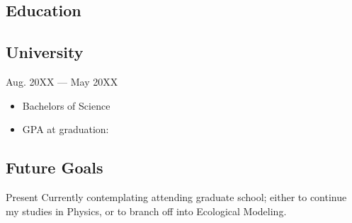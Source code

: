 \documentclass[letterpaper]{easyCV}
\begin{document}
\begin{main}
\section{Education}
\subsection{University}{Aug. 20XX --- May 20XX}
\begin{itemize}[topsep=0ex,leftmargin=*,itemsep=0.1cm]
\item Bachelors of Science
\item GPA at graduation: 
\end{itemize}

\subsection{Future Goals}{Present}
Currently contemplating attending graduate school; either to continue my studies in Physics, or to branch off into Ecological Modeling.  

\end{main}
\end{document}

